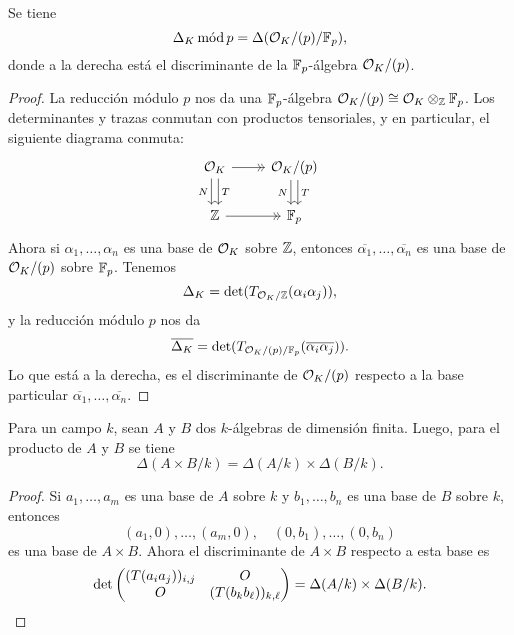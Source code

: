 \begin{lema}
  Se tiene
  $$\Delta_K \operatorname{\text{mód}} p = \Delta (\mathcal{O}_K/(p)/\mathbb{F}_p),$$
  donde a la derecha está el discriminante de la $\mathbb{F}_p$-álgebra $\mathcal{O}_K/(p)$.

  \begin{proof}
    La reducción módulo $p$ nos da una $\mathbb{F}_p$-álgebra
    ${\mathcal{O}_K/(p) \cong \mathcal{O}_K \otimes_{\mathbb{Z}} \mathbb{F}_p}$. Los determinantes y trazas
    conmutan con productos tensoriales, y en particular, el siguiente diagrama
    conmuta:
    \[ \begin{tikzcd}
      \O_K \ar[->>]{r}\ar[shift right=0.25em]{d}[swap]{N}\ar[shift left=0.25em]{d}{T} & \O_K/(p) \ar[shift right=0.25em]{d}[swap]{N}\ar[shift left=0.25em]{d}{T} \\
      \ZZ \ar[->>]{r} & \FF_p
    \end{tikzcd} \]
    Ahora si $\alpha_1, \ldots, \alpha_n$ es una base de $\mathcal{O}_K$ sobre $\mathbb{Z}$,
    entonces $\overline{\alpha_1}, \ldots, \overline{\alpha_n}$ es una base de
    $\mathcal{O}_K/(p)$ sobre $\mathbb{F}_p$. Tenemos
    $$\Delta_K = \det (T_{\mathcal{O}_K/\mathbb{Z}} (\alpha_i \alpha_j)),$$
    y la reducción módulo $p$ nos da
    \[ \overline{\Delta_K} =
       \det (T_{\mathcal{O}_K/(p)/\mathbb{F}_p} (\overline{\alpha_i} \overline{\alpha_j})). \]
    Lo que está a la derecha, es el discriminante de $\mathcal{O}_K/(p)$ respecto
    a la base particular $\overline{\alpha_1}, \ldots, \overline{\alpha_n}$.
  \end{proof}
\end{lema}

\begin{lema}
  Para un campo $k$, sean $A$ y $B$ dos $k$-álgebras de dimensión finita. Luego,
  para el producto de $A$ y $B$ se tiene
  $$\Delta (A\times B/k) = \Delta (A/k) \times \Delta (B/k).$$

  \begin{proof}
    Si $a_1,\ldots,a_m$ es una base de $A$ sobre $k$ y $b_1,\ldots,b_n$ es una
    base de $B$ sobre $k$, entonces
    $$(a_1, 0), \ldots, (a_m, 0), \quad (0, b_1), \ldots, (0, b_n)$$
    es una base de $A\times B$. Ahora el discriminante de $A\times B$
    respecto a esta base es
    \[ \det \begin{pmatrix}
      (T (a_i a_j))_{i,j} & O \\
      O & (T (b_k b_\ell))_{k, \ell}
    \end{pmatrix} = \Delta (A/k) \times \Delta (B/k). \qedhere \]
  \end{proof}
\end{lema}

